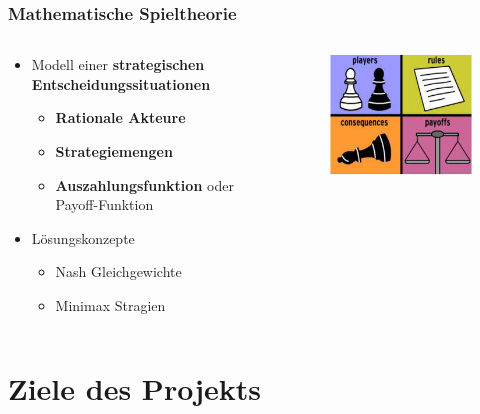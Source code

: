 \documentclass{beamer}
\begin{document}
		\begin{frame}
			\frametitle{Mathematische Spieltheorie}
			\begin{columns}
				\begin{column}{0.58\textwidth}
					\begin{itemize}
                        \item Modell einer \textbf{strategischen
                            Entscheidungssituationen} 
                            \begin{itemize}
                                \item \textbf{Rationale Akteure}
                                \item \textbf{Strategiemengen}
                                \item \textbf{Auszahlungsfunktion} oder Payoff-Funktion
                            \end{itemize}
                        \item Lösungskonzepte
                            \begin{itemize}
                                \item Nash Gleichgewichte
                                \item Minimax Stragien
                            \end{itemize}
					\end{itemize}
				\end{column}
				\begin{column}{0.48\textwidth}
					\begin{figure}
						\includegraphics[scale = 0.45]{images/gameTheory.jpeg}
					\end{figure}
				\end{column}
			\end{columns}
		\end{frame}
		
	\section{Ziele des Projekts}
	
\end{document}
